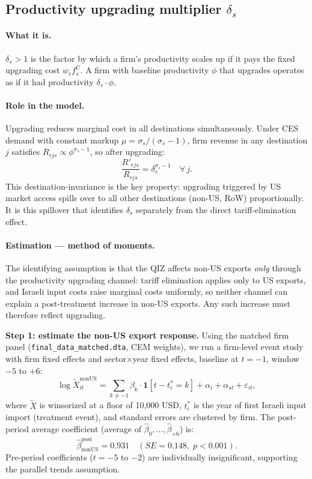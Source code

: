 \documentclass[12pt]{article}
\begin{document}
\subsection{Productivity upgrading multiplier $\delta_s$}

\paragraph{What it is.}
$\delta_s > 1$ is the factor by which a firm's productivity scales up if it
pays the fixed upgrading cost $w_r f^U_s$. A firm with baseline productivity
$\phi$ that upgrades operates as if it had productivity $\delta_s \cdot \phi$.

\paragraph{Role in the model.}
Upgrading reduces marginal cost in all destinations simultaneously. Under
CES demand with constant markup $\mu = \sigma_s/(\sigma_s-1)$, firm revenue
in any destination $j$ satisfies $R_{rjs} \propto \phi^{\sigma_s-1}$, so
after upgrading:
\[
\frac{R'_{rjs}}{R_{rjs}} = \delta_s^{\sigma_s - 1} \quad \forall\, j.
\]
This destination-invariance is the key property: upgrading triggered by
US market access spills over to all other destinations (non-US, RoW)
proportionally. It is this spillover that identifies $\delta_s$ separately
from the direct tariff-elimination effect.

\paragraph{Estimation --- method of moments.}
The identifying assumption is that the QIZ affects non-US exports
\emph{only} through the productivity upgrading channel: tariff elimination
applies only to US exports, and Israeli input costs raise marginal costs
uniformly, so neither channel can explain a post-treatment increase in
non-US exports. Any such increase must therefore reflect upgrading.

\medskip
\noindent\textbf{Step 1: estimate the non-US export response.}
Using the matched firm panel (\texttt{final\_data\_matched.dta}, CEM weights),
we run a firm-level event study with firm fixed effects and sector$\times$year
fixed effects, baseline at $t=-1$, window $-5$ to $+6$:
\[
\log \widetilde{X}_{it}^{\mathrm{nonUS}} =
  \sum_{k \neq -1} \beta_k \cdot \mathbf{1}[t - t_i^* = k]
  + \alpha_i + \alpha_{st} + \varepsilon_{it},
\]
where $\widetilde{X}$ is winsorized at a floor of 10{,}000 USD,
$t_i^*$ is the year of first Israeli input import (treatment event),
and standard errors are clustered by firm. The post-period average
coefficient (average of $\hat\beta_0,\ldots,\hat\beta_{+6}$) is:
\[
\hat\beta^{\mathrm{post}}_{\mathrm{nonUS}} = 0.931 \quad
(SE = 0.148,\; p < 0.001).
\]
Pre-period coefficients ($t = -5$ to $-2$) are individually insignificant,
supporting the parallel trends assumption.
\end{document}
